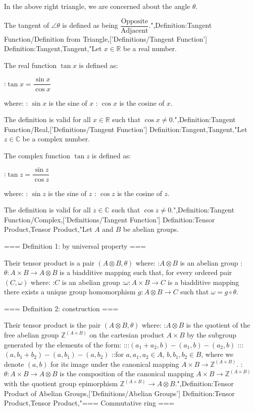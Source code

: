 In the above right triangle, we are concerned about the angle $\theta$.

The tangent of $\angle \theta$ is defined as being $\dfrac{\text{Opposite}} {\text{Adjacent}}$.",Definition:Tangent Function/Definition from Triangle,['Definitions/Tangent Function']
Definition:Tangent,Tangent,"Let $x \in \mathbb R$ be a real number.

The real function $\tan x$ is defined as:

:$\tan x = \dfrac {\sin x} {\cos x}$

where:
: $\sin x$ is the sine of $x$
: $\cos x$ is the cosine of $x$.

The definition is valid for all $x \in \mathbb R$ such that $\cos x \ne 0$.",Definition:Tangent Function/Real,['Definitions/Tangent Function']
Definition:Tangent,Tangent,"Let $z \in \mathbb C$ be a complex number.

The complex function $\tan z$ is defined as:

:$\tan z = \dfrac {\sin z} {\cos z}$

where:
: $\sin z$ is the sine of $z$
: $\cos z$ is the cosine of $z$.

The definition is valid for all $z \in \mathbb C$ such that $\cos z \ne 0$.",Definition:Tangent Function/Complex,['Definitions/Tangent Function']
Definition:Tensor Product,Tensor Product,"Let $A$ and $B$ be abelian groups.


=== Definition 1: by universal property ===

Their tensor product is a pair $\left( A \otimes B, \theta \right)$ where:
:$A \otimes B$ is an abelian group
:$\theta : A \times B \to A \otimes B$ is a biadditive mapping such that, for every ordered pair $\left( C, \omega \right)$ where:
:$C$ is an abelian group
:$\omega : A \times B \to C$ is a biadditive mapping
there exists a unique group homomorphism $g : A \otimes B \to C$ such that $\omega = g \circ \theta$.


=== Definition 2: construction ===

Their tensor product is the pair $\left( A \otimes B, \theta \right)$ where:
:$A \otimes B$ is the quotient of the free abelian group $\mathbb Z^{\left( A \times B \right) }$ on the cartesian product $A \times B$ by the subgroup generated by the elements of the form:
:::$\left( a_1 + a_2, b \right) - \left( a_1, b \right) - \left( a_2, b \right)$
:::$\left( a, b_1 + b_2 \right) - \left( a, b_1 \right) - \left( a, b_2 \right)$
::for $a, a_1, a_2 \in A$, $b, b_1, b_2 \in B$, where we denote $\left( a, b \right)$ for its image under the canonical mapping $A \times B \to \mathbb Z^{\left( A \times B \right) }$.
:$\theta : A \times B \to A \otimes B$ is the composition of the canonical mapping $A \times B \to \mathbb Z^{\left( A \times B \right) }$ with the quotient group epimorphism $\mathbb Z^{\left( A \times B \right) } \to A \otimes B$.",Definition:Tensor Product of Abelian Groups,['Definitions/Abelian Groups']
Definition:Tensor Product,Tensor Product,"=== Commutative ring ===

